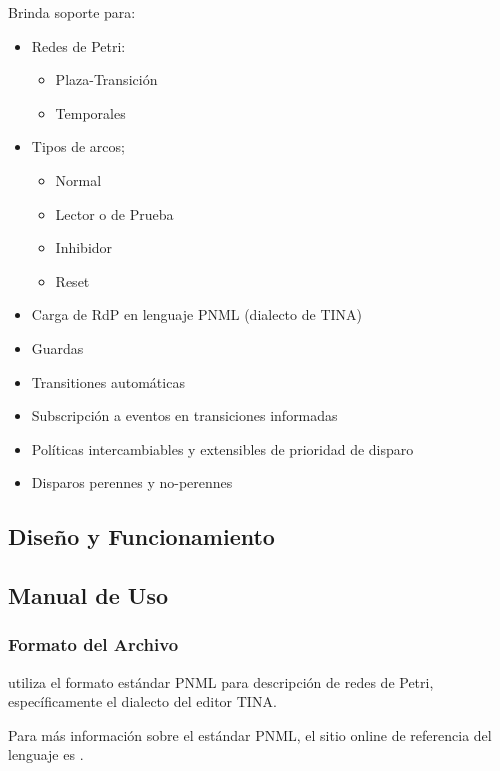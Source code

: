 Brinda soporte para:
\begin{itemize}
  \item Redes de Petri:
  \begin{itemize}
    \item Plaza-Transición
    \item Temporales
  \end{itemize}
  
  \item Tipos de arcos;
  \begin{itemize}
    \item Normal
    \item Lector o de Prueba
    \item Inhibidor
    \item Reset
  \end{itemize}
  
  \item Carga de RdP en lenguaje PNML (dialecto de TINA)
  \item Guardas
  \item Transitiones automáticas
  \item Subscripción a eventos en transiciones informadas
  \item Políticas intercambiables y extensibles de prioridad de disparo
  \item Disparos perennes y no-perennes

\end{itemize}

\subsection{Diseño y Funcionamiento}

\subsection{Manual de Uso}

\subsubsection{Formato del Archivo}

\javapetriconcurrencymonitor utiliza el formato estándar PNML para descripción
de redes de Petri, específicamente el dialecto del editor TINA\cite{TinaSite}.

Para más información sobre el estándar PNML, el sitio online de referencia del
lenguaje es \cite{PnmlSite}.

